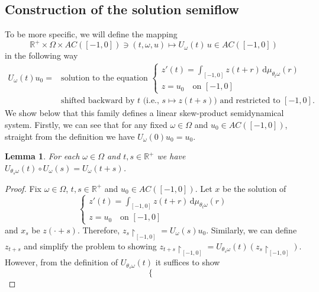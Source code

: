 \documentclass[reqno]{amsart}
\theoremstyle{plain}
\newtheorem{lemma}{Lemma}[section]
\numberwithin{equation}{section}
\numberwithin{definition}{section}
\newcommand\RR{\ensuremath{\mathbb{R}}}
\begin{document}
{\subsection{Construction of the solution semiflow}
To be more specific, we will define the mapping 
\begin{equation*}
 \RR^{+} \times \Omega \times AC([-1,0]) \ni (t,\omega,u) \mapsto U_{\omega}(t)\,u \in AC([-1,0]) 
\end{equation*} 
in the following way 
\begin{equation*}
\begin{split}
U_\omega(t) u_0 ={}& \text{solution to the equation } 
\begin{cases} 
z'(t) = \displaystyle \int_{[-1,0]} z(t+r) \, \mathrm{d}\mu_{\theta_{t}\omega}(r) \\ 
z = u_0 \quad \text{on } [-1,0] 
\end{cases} \\
&\text{shifted backward by } t \text{ (i.e., } s \mapsto z(t+s) \text{) and restricted to } [-1,0].
\end{split}
\end{equation*}
We show below that this family defines a linear skew-product semidynamical system. Firstly, we can see that for any fixed $\omega\in \Omega$ and $u_0\in AC([-1,0])$, straight from the definition we have $U_{\omega}(0)u_0 = u_0$.  
\begin{lemma}\label{lemma:cocycle-U-AC}
    For each $\omega\in \Omega$ and $t,s\in \RR^+$ we have $U_{\theta_{s}\omega}(t) \circ U_{\omega}(s)= U_{\omega}(t+s)$.
\end{lemma}
\begin{proof}
Fix $\omega\in \Omega$, $t,s\in \RR^+$ and $u_0\in AC([-1,0])$. Let $x$ be the solution of 
\begin{equation*}
\begin{cases} 
z'(t) = \displaystyle \int_{[-1,0]} z(t+r) \, \mathrm{d}\mu_{\theta_{t}\omega}(r) \\ 
z = u_0 \quad \text{on } [-1,0] 
\end{cases}
\end{equation*}
and $x_s$ be $z(\cdot+s)$. Therefore, $z_s{\restriction}_{[-1,0]} = U_{\omega}(s)u_0$. Similarly, we can define $z_{t+s}$ and simplify the problem to showing $z_{t+s}{\restriction}_{[-1,0]} = U_{\theta_s \omega }(t)(z_s{\restriction}_{[-1,0]})$. However, from the definition of $U_{\theta_s \omega }(t)$ it suffices to show 
\begin{equation*}
\begin{cases}

\end{cases}
\end{equation*}
\end{proof}}
\end{document}
